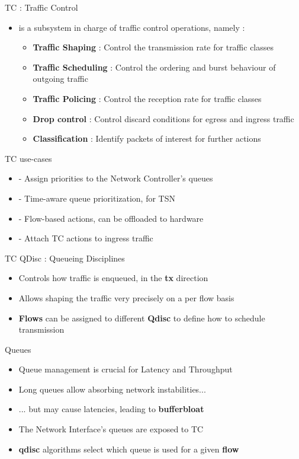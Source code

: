 \begin{frame}{TC : Traffic Control}
	\begin{itemize}
		\item {} is a subsystem in charge of traffic control operations, namely :
			\begin{itemize}
				\item \textbf{Traffic Shaping} : Control the transmission rate for traffic classes
				\item \textbf{Traffic Scheduling} : Control the ordering and burst behaviour of outgoing traffic
				\item \textbf{Traffic Policing} : Control the reception rate for traffic classes
				\item \textbf{Drop control} : Control discard conditions for egress and ingress traffic
				\item \textbf{Classification} : Identify packets of interest for further actions
			\end{itemize}
	\end{itemize}
\end{frame}

\begin{frame}{TC use-cases}
	\begin{itemize}
		\item {} - Assign priorities to the Network Controller's queues
		\item {} - Time-aware queue prioritization, for TSN
		\item {} - Flow-based actions, can be offloaded to hardware
		\item {} - Attach TC actions to ingress traffic
	\end{itemize}
\end{frame}

\begin{frame}{TC QDisc : Queueing Disciplines}
	\begin{itemize}
		\item Controls how traffic is enqueued, in the \textbf{tx} direction
		\item Allows shaping the traffic very precisely on a per flow basis
		\item \textbf{Flows} can be assigned to different \textbf{Qdisc} to define how to schedule transmission
	\end{itemize}
\end{frame}

\begin{frame}{Queues}
	\begin{itemize}
		\item Queue management is crucial for Latency and Throughput
		\item Long queues allow absorbing network instabilities...
		\item ... but may cause latencies, leading to \textbf{bufferbloat}
		\item The Network Interface's queues are exposed to TC
		\item \textbf{qdisc} algorithms select which queue is used for a given \textbf{flow}
	\end{itemize}
\end{frame}

